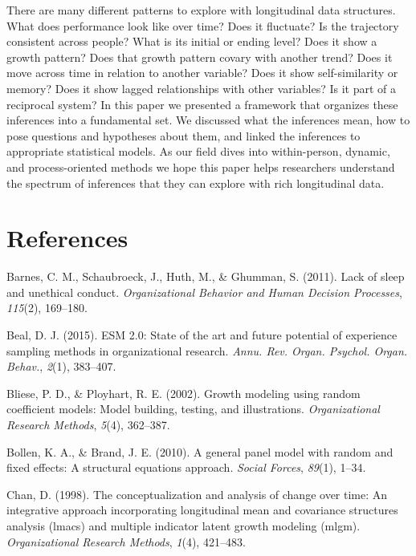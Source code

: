 \documentclass[english,,man]{apa6}
\theoremstyle{definition}
\theoremstyle{definition}
\theoremstyle{definition}
\theoremstyle{remark}
\begin{document}
There are many different patterns to explore with longitudinal data
structures. What does performance look like over time? Does it
fluctuate? Is the trajectory consistent across people? What is its
initial or ending level? Does it show a growth pattern? Does that growth
pattern covary with another trend? Does it move across time in relation
to another variable? Does it show self-similarity or memory? Does it
show lagged relationships with other variables? Is it part of a
reciprocal system? In this paper we presented a framework that organizes
these inferences into a fundamental set. We discussed what the
inferences mean, how to pose questions and hypotheses about them, and
linked the inferences to appropriate statistical models. As our field
dives into within-person, dynamic, and process-oriented methods we hope
this paper helps researchers understand the spectrum of inferences that
they can explore with rich longitudinal data.

\newpage

\hypertarget{references}{%
\section{References}\label{references}}

\setlength{\parindent}{-0.5in}
\setlength{\leftskip}{0.5in}

\hypertarget{refs}{}
\leavevmode\hypertarget{ref-barnes_lack_2011}{}%
Barnes, C. M., Schaubroeck, J., Huth, M., \& Ghumman, S. (2011). Lack of
sleep and unethical conduct. \emph{Organizational Behavior and Human
Decision Processes}, \emph{115}(2), 169--180.

\leavevmode\hypertarget{ref-beal_esm_2015}{}%
Beal, D. J. (2015). ESM 2.0: State of the art and future potential of
experience sampling methods in organizational research. \emph{Annu. Rev.
Organ. Psychol. Organ. Behav.}, \emph{2}(1), 383--407.

\leavevmode\hypertarget{ref-bliese_growth_2002}{}%
Bliese, P. D., \& Ployhart, R. E. (2002). Growth modeling using random
coefficient models: Model building, testing, and illustrations.
\emph{Organizational Research Methods}, \emph{5}(4), 362--387.

\leavevmode\hypertarget{ref-bollen_general_2010}{}%
Bollen, K. A., \& Brand, J. E. (2010). A general panel model with random
and fixed effects: A structural equations approach. \emph{Social
Forces}, \emph{89}(1), 1--34.

\leavevmode\hypertarget{ref-chan1998conceptualization}{}%
Chan, D. (1998). The conceptualization and analysis of change over time:
An integrative approach incorporating longitudinal mean and covariance
structures analysis (lmacs) and multiple indicator latent growth
modeling (mlgm). \emph{Organizational Research Methods}, \emph{1}(4),
421--483.
\end{document}
